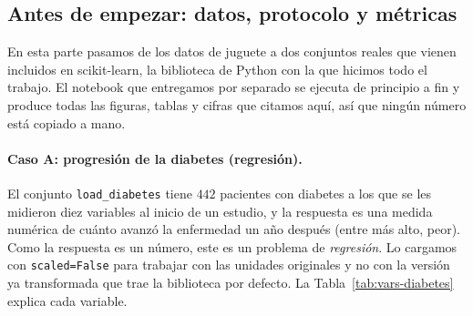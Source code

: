 \subsection{Antes de empezar: datos, protocolo y métricas}

\noindent En esta parte pasamos de los datos de juguete a dos conjuntos
reales que vienen incluidos en scikit-learn, la biblioteca de Python con
la que hicimos todo el trabajo. El notebook que entregamos por separado se
ejecuta de principio a fin y produce todas las figuras, tablas y cifras
que citamos aquí, así que ningún número está copiado a mano.

\paragraph{Caso A: progresión de la diabetes (regresión).}
El conjunto \texttt{load\_diabetes} tiene $442$ pacientes con diabetes a
los que se les midieron diez variables al inicio de un estudio, y la
respuesta es una medida numérica de cuánto avanzó la enfermedad un año
después (entre más alto, peor). Como la respuesta es un número, este es un
problema de \emph{regresión}. Lo cargamos con \texttt{scaled=False} para
trabajar con las unidades originales y no con la versión ya transformada
que trae la biblioteca por defecto. La Tabla~\ref{tab:vars-diabetes}
explica cada variable.

